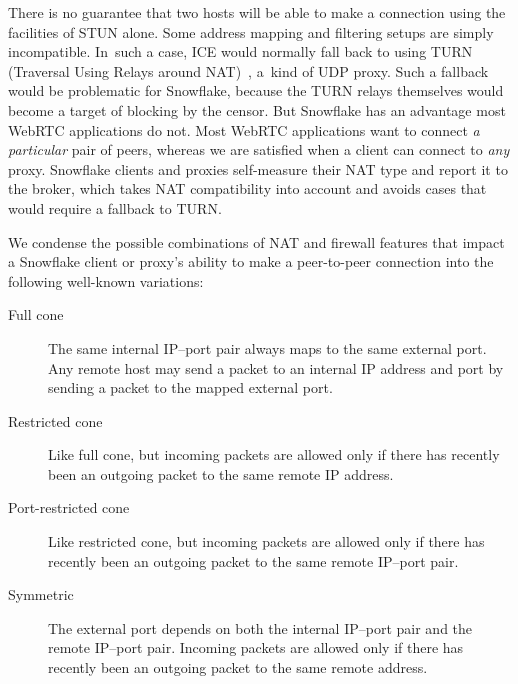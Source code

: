 \documentclass[letterpaper,twocolumn]{article}
\begin{document}
There is no guarantee that two hosts will be able to make
a connection using the facilities of STUN alone.
Some address mapping and
filtering setups are simply incompatible.
In~such a case,
ICE would normally fall back to using
TURN (Traversal Using Relays around NAT)~\cite{rfc8656},
a~kind of UDP proxy.
Such a fallback would be problematic for Snowflake,
because the TURN relays themselves
would become a target of blocking by the censor.
But Snowflake has an advantage most WebRTC applications do not.
Most WebRTC applications want to connect \emph{a particular} pair of peers,
whereas we are satisfied when a client can connect to \emph{any} proxy.
Snowflake clients and proxies self-measure their NAT type
and report it to the broker,
which takes NAT compatibility into account
and avoids cases that would require a fallback to TURN.


We condense the possible combinations of NAT and firewall features
that impact
a Snowflake client or proxy's
ability to make a peer-to-peer connection
into the following well-known variations:

\begin{description}
\item[Full cone]
The same internal IP--port pair always maps to the same external port.
Any remote host may send a packet to an internal IP address and port by sending a packet to the
mapped external port.
\item[Restricted cone]
Like full cone,
but incoming packets
are allowed only if
there has recently been an outgoing packet
to the same remote IP address.
\item[Port-restricted cone]
Like restricted cone,
but incoming packets are allowed only if
there has recently been an outgoing packet
to the same remote IP--port pair.
\item[Symmetric]
The external port depends on both
the internal IP--port pair and the remote IP--port pair.
Incoming packets are allowed only if
there has recently been an outgoing
packet to the same remote address.
\end{description}
\end{document}

